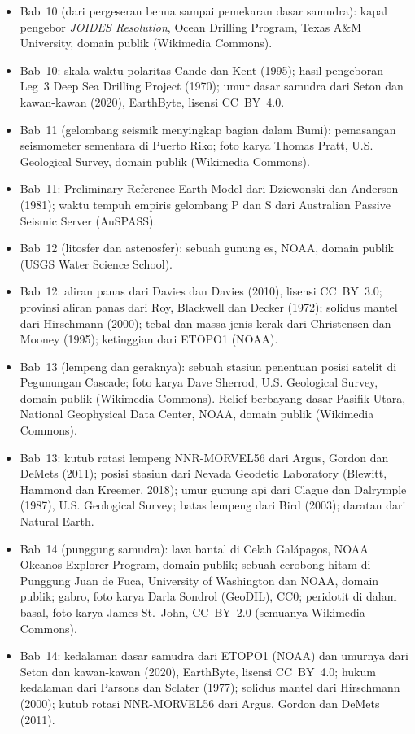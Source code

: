 \begin{itemize}
  \item Bab~10 (dari pergeseran benua sampai pemekaran dasar samudra): kapal pengebor \emph{JOIDES Resolution}, Ocean Drilling Program, Texas A\&M University, domain publik (Wikimedia Commons).
  \item Bab~10: skala waktu polaritas Cande dan Kent (1995); hasil pengeboran Leg~3 Deep Sea Drilling Project (1970); umur dasar samudra dari Seton dan kawan-kawan (2020), EarthByte, lisensi CC~BY~4.0.
  \item Bab~11 (gelombang seismik menyingkap bagian dalam Bumi): pemasangan seismometer sementara di Puerto Riko; foto karya Thomas Pratt, U.S. Geological Survey, domain publik (Wikimedia Commons).
  \item Bab~11: Preliminary Reference Earth Model dari Dziewonski dan Anderson (1981); waktu tempuh empiris gelombang P dan S dari Australian Passive Seismic Server (AuSPASS).
  \item Bab~12 (litosfer dan astenosfer): sebuah gunung es, NOAA, domain publik (USGS Water Science School).
  \item Bab~12: aliran panas dari Davies dan Davies (2010), lisensi CC~BY~3.0; provinsi aliran panas dari Roy, Blackwell dan Decker (1972); solidus mantel dari Hirschmann (2000); tebal dan massa jenis kerak dari Christensen dan Mooney (1995); ketinggian dari ETOPO1 (NOAA).
  \item Bab~13 (lempeng dan geraknya): sebuah stasiun penentuan posisi satelit di Pegunungan Cascade; foto karya Dave Sherrod, U.S. Geological Survey, domain publik (Wikimedia Commons). Relief berbayang dasar Pasifik Utara, National Geophysical Data Center, NOAA, domain publik (Wikimedia Commons).
  \item Bab~13: kutub rotasi lempeng NNR-MORVEL56 dari Argus, Gordon dan DeMets (2011); posisi stasiun dari Nevada Geodetic Laboratory (Blewitt, Hammond dan Kreemer, 2018); umur gunung api dari Clague dan Dalrymple (1987), U.S. Geological Survey; batas lempeng dari Bird (2003); daratan dari Natural Earth.
  \item Bab~14 (punggung samudra): lava bantal di Celah Galápagos, NOAA Okeanos Explorer Program, domain publik; sebuah cerobong hitam di Punggung Juan de Fuca, University of Washington dan NOAA, domain publik; gabro, foto karya Darla Sondrol (GeoDIL), CC0; peridotit di dalam basal, foto karya James St.~John, CC~BY~2.0 (semuanya Wikimedia Commons).
  \item Bab~14: kedalaman dasar samudra dari ETOPO1 (NOAA) dan umurnya dari Seton dan kawan-kawan (2020), EarthByte, lisensi CC~BY~4.0; hukum kedalaman dari Parsons dan Sclater (1977); solidus mantel dari Hirschmann (2000); kutub rotasi NNR-MORVEL56 dari Argus, Gordon dan DeMets (2011).

\end{itemize}
